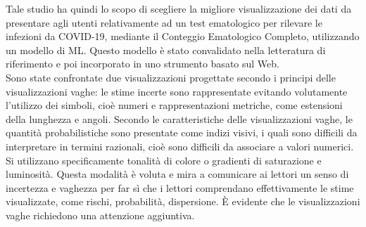 Tale studio ha quindi lo scopo di scegliere la migliore visualizzazione dei dati da presentare agli utenti relativamente ad un test ematologico per rilevare le infezioni da COVID-19, mediante il Conteggio Ematologico Completo, utilizzando un modello di ML. Questo modello è stato convalidato nella letteratura di riferimento e poi incorporato in uno strumento basato sul Web.\\
Sono state confrontate due visualizzazioni progettate secondo i principi delle visualizzazioni vaghe: le stime incerte sono rappresentate evitando volutamente l'utilizzo dei simboli, cioè numeri e rappresentazioni metriche, come estensioni della lunghezza e angoli. Secondo le caratteristiche delle visualizzazioni vaghe, le quantità probabilistiche sono presentate come indizi visivi, i quali sono difficili da interpretare in termini razionali, cioè sono difficili da associare a valori numerici. Si utilizzano specificamente tonalità di colore o gradienti di saturazione e luminosità. Questa modalità è voluta e mira a comunicare ai lettori un senso di incertezza e vaghezza per far sì che i lettori comprendano effettivamente le stime visualizzate, come rischi, probabilità, dispersione. È evidente che le visualizzazioni vaghe richiedono una attenzione aggiuntiva.\\

